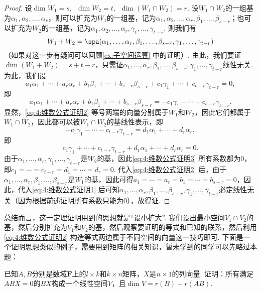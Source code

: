 \begin{proof}
    设$\dim W_1=s,\enspace \dim W_2=t,\enspace \dim(W_1\cap W_2)=r$. 设$W_1\cap W_2$的一组基为$\alpha_1,\alpha_2,\ldots,\alpha_r$，则可以扩充为$W_1$的一组基，记为$\alpha_1,\alpha_2,\ldots,\alpha_r,\beta_1,\ldots,\beta_{s-r}$；也可以扩充为$W_2$的一组基，记为$\alpha_1,\alpha_2,\ldots,\alpha_r,\gamma_1,\ldots,\gamma_{t-r}$. 则我们有
    \[W_1+W_2=\spa(\alpha_1,\ldots,\alpha_r,\beta_1,\ldots,\beta_{s-r},\gamma_1,\ldots,\gamma_{t-r})\]
    （如果对这一步有疑问可以回顾\autoref{ex:子空间运算} 中的证明）. 由此，我们要证$\dim (W_1+W_2)=s+t-r$，只需证$\alpha_1,\ldots,\alpha_r,\beta_1,\ldots,\beta_{s-r},\gamma_1,\ldots,\gamma_{t-r}$线性无关. 为此，我们设
    \begin{equation}\label{eq:4:维数公式证明1}
        a_1\alpha_1+\cdots+a_r\alpha_r+b_1\beta_1+\cdots+b_{s-r}\beta_{s-r}+c_1\gamma_1+\cdots+c_{t-r}\gamma_{t-r}=0,
    \end{equation}
    即
    \begin{equation}\label{eq:4:维数公式证明2}
        a_1\alpha_1+\cdots+a_r\alpha_r+b_1\beta_1+\cdots+b_{s-r}\beta_{s-r}=-c_1\gamma_1-\cdots-c_{t-r}\gamma_{t-r}.
    \end{equation}
    显然，\autoref{eq:4:维数公式证明2} 等号两端的向量分别属于$W_1$和$W_2$，因此它们都属于$W_1\cap W_2$，因此都可以被$W_1\cap W_2$的基线性表示，即
    \[-c_1\gamma_1-\cdots-c_{t-r}\gamma_{t-r}=d_1\alpha_1+\cdots+d_r\alpha_r,\]
    即
    \begin{equation}\label{eq:4:维数公式证明3}
        c_1\gamma_1+\cdots+c_{t-r}\gamma_{t-r}+d_1\alpha_1+\cdots+d_r\alpha_r=0.
    \end{equation}
    由于$\alpha_1,\ldots,\alpha_r,\gamma_1,\ldots,\gamma_{t-r}$是$W_2$的基，因此\autoref{eq:4:维数公式证明3} 所有系数都为0，即$c_1=\cdots=c_{t-r}=d_1=\cdots=d_r=0$. 代入\autoref{eq:4:维数公式证明2} 后，由于$\alpha_1,\ldots,\alpha_r,\beta_1,\ldots,\beta_{s-r}$是$W_1$的基，因此可得$a_1=\cdots=a_r=b_1=\cdots=b_{s-r}=0$，因此，代入\autoref{eq:4:维数公式证明1} 后可知$\alpha_1,\ldots,\alpha_r,\beta_1,\ldots,\beta_{s-r},\gamma_1,\ldots,\gamma_{t-r}$必定线性无关（因为根据前述证明所有系数只能为0），故得证.
\end{proof}

总结而言，这一定理证明用到的思想就是``设小扩大''. 我们设出最小空间$V_1\cap V_2$的基，然后分别扩充为$V_1$和$V_2$的基，然后观察要证明的等式和已知的联系，然后利用\autoref{eq:4:维数公式证明2} 构造等式两边属于不同空间的向量这一技巧即可. 下面是一个证明思想类似的例子，需要用到矩阵的相关知识，暂未学到的同学可以先略过本题：
\begin{example}{}{}
    已知$A,B$分别是数域$\mathbf{F}$上的$l \times k$和$k \times n$矩阵，$X$是$n \times 1$的列向量. 证明：所有满足$ABX=0$的$BX$构成一个线性空间$V$，且$\dim V = r(B) - r(AB)$.
\end{example}

